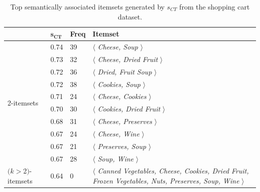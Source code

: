 \begin{table}
\begin{center}
\begin{tabular}{l|l | l | l }
  \hline
&$\mathbf{s_{CT}}$       &\textbf{Freq}&   \textbf{Itemset}\\
  \hline\hline
\multirow{10}{*}{2-itemsets}& 0.74	&	39	&$\langle$\emph{	Cheese,	Soup	}$\rangle$\\
&0.73	&	32	&$\langle$\emph{	Cheese,	Dried Fruit	}$\rangle$\\
&0.72	&	36	&$\langle$\emph{	Dried, Fruit	Soup	}$\rangle$\\
&0.72	&	38	&$\langle$\emph{	Cookies,	Soup	}$\rangle$\\
&0.71	&	24	&$\langle$\emph{	Cheese,	Cookies	}$\rangle$\\
&0.70	&	30	&$\langle$\emph{	Cookies,	Dried Fruit	}$\rangle$\\
&0.68	&	31	&$\langle$\emph{	Cheese,	Preserves	}$\rangle$\\
&0.67   &	24	&$\langle$\emph{	Cheese,	Wine	}$\rangle$\\
&0.67	&	21	&$\langle$\emph{	Preserves,	Soup	}$\rangle$\\
&0.67	&	28	&$\langle$\emph{	Soup,	Wine	}$\rangle$\\
\hline
\parbox{1cm}{$(k$$>$2$)$-itemsets}&0.64 &	0	&\parbox{6cm}{$\langle$\emph{ Canned Vegetables, Cheese, Cookies, Dried Fruit, Frozen Vegetables, Nuts, Preserves, Soup, Wine }$\rangle$}\\
  \hline
\end{tabular}
\end{center}
\caption{\label{tbl:foodmart_ct} Top semantically associated itemsets generated by $s_{CT}$ from the shopping cart dataset.}
\end{table}

